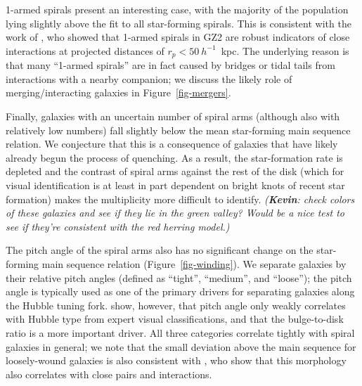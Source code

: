 \documentclass{emulateapj}
\newcommand{\kevin}{{\color{red}\textbf{Kevin}}}
\begin{document}
1-armed spirals present an interesting case, with the majority of the population lying slightly above the fit to all star-forming spirals. This is consistent with the work of \citet{cas13}, who showed that 1-armed spirals in GZ2 are robust indicators of close interactions at projected distances of $r_p < 50~h^{-1}$~kpc. The underlying reason is that many ``1-armed spirals'' are in fact caused by bridges or tidal tails from interactions with a nearby companion; we discuss the likely role of merging/interacting galaxies in Figure~\ref{fig-mergers}. 

Finally, galaxies with an uncertain number of spiral arms (although also with relatively low numbers) fall slightly below the mean star-forming main sequence relation. We conjecture that this is a consequence of galaxies that have likely already begun the process of quenching. As a result, the star-formation rate is depleted and the contrast of spiral arms against the rest of the disk (which for visual identification is at least in part dependent on bright knots of recent star formation) makes the multiplicity more difficult to identify. {\it (\kevin: check colors of these galaxies and see if they lie in the green valley? Would be a nice test to see if they're consistent with the red herring model.)}

The pitch angle of the spiral arms also has no significant change on the star-forming main sequence relation (Figure~\ref{fig-winding}). We separate galaxies by their relative pitch angles (defined as ``tight'', ``medium'', and ``loose''); the pitch angle is typically used as one of the primary drivers for separating galaxies along the Hubble tuning fork. \citet{wil13} show, however, that pitch angle only weakly correlates with Hubble type from expert visual classifications, and that the bulge-to-disk ratio is a more important driver. All three categories correlate tightly with spiral galaxies in general; we note that the small deviation above the main sequence for loosely-wound galaxies is also consistent with \citet{cas13}, who show that this morphology also correlates with close pairs and interactions. 
\end{document}
